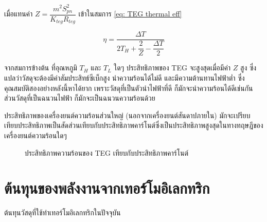 \message{ !name(solar.tex)}\documentclass[
a4paper,
svgnames,
openany,
justified,
]{tufte-book}
\begin{document}
เมื่อแทนค่า $Z = \dfrac{m^2 S_{pn}^2}{K_{teg} R_{teg}}$ เข้าในสมการ \ref{eq: TEG thermal
eff}

\begin{equation}
  \eta = \dfrac{ \Delta T }{ 2 T_H + \dfrac{2}{Z} - \dfrac{ \Delta T }{ 2 } }
\end{equation}

จากสมการข้างต้น ที่อุณหภูมิ $T_H$ และ $T_L$ ใดๆ ประสิทธิภาพของ TEG จะสูงสุดเมื่อมีค่า $Z$ สูง ซึ่งแปลว่าวัสดุจะต้องมีค่าสัมประสิทธ์ซีเบ็กสูง นำความร้อนได้ไม่ดี และมีความต้านทานไฟฟ้าต่ำ ซึ่งคุณสมบัติสองอย่างหลังนี้หาได้ยาก เพราะวัสดุที่เป็นตัวนำไฟฟ้าที่ดี ก็มักจะนำความร้อนได้ดีเช่นกัน ส่วนวัสดุที่เป็นฉนวนไฟฟ้า ก็มักจะเป็นฉนวนความร้อนด้วย

ประสิทธิภาพของเครื่องยนต์ความร้อนส่วนใหญ่ (นอกจากเครื่องยนต์สันดาปภายใน) มักจะเปรียบเทียบประสิทธิภาพเป็นสัดส่วนเทียบกับประสิทธิภาพคาร์โนต์ซึ่งเป็นประสิทธิภาพสูงสุดในทางทฤษฎีของเครื่องยนต์ความร้อนใดๆ

\begin{figure}[h]
  \centering
  \caption{ประสิทธิภาพความร้อนของ TEG เทียบกับประสิทธิภาพคาร์โนต์}
  \label{fig:teg vs carnot efficiency}
\end{figure}

\section{ต้นทุนของพลังงานจากเทอร์โมอิเลกทริก}

ต้นทุนวัสดุที่ใช้ทำเทอร์โมอิเลกทริกในปัจจุบัน
\end{document}
